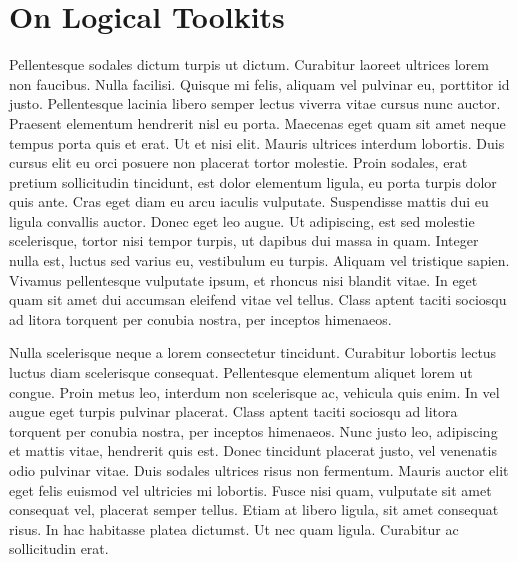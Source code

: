 \chapter{On Logical Toolkits}
Pellentesque sodales dictum turpis ut dictum. Curabitur laoreet ultrices lorem non faucibus. Nulla facilisi. Quisque mi felis, aliquam vel pulvinar eu, porttitor id justo. Pellentesque lacinia libero semper lectus viverra vitae cursus nunc auctor. Praesent elementum hendrerit nisl eu porta. Maecenas eget quam sit amet neque tempus porta quis et erat. Ut et nisi elit. Mauris ultrices interdum lobortis. Duis cursus elit eu orci posuere non placerat tortor molestie. Proin sodales, erat pretium sollicitudin tincidunt, est dolor elementum ligula, eu porta turpis dolor quis ante. Cras eget diam eu arcu iaculis vulputate. Suspendisse mattis dui eu ligula convallis auctor. Donec eget leo augue. Ut adipiscing, est sed molestie scelerisque, tortor nisi tempor turpis, ut dapibus dui massa in quam. Integer nulla est, luctus sed varius eu, vestibulum eu turpis. Aliquam vel tristique sapien. Vivamus pellentesque vulputate ipsum, et rhoncus nisi blandit vitae. In eget quam sit amet dui accumsan eleifend vitae vel tellus. Class aptent taciti sociosqu ad litora torquent per conubia nostra, per inceptos himenaeos.

Nulla scelerisque neque a lorem consectetur tincidunt. Curabitur lobortis lectus luctus diam scelerisque consequat. Pellentesque elementum aliquet lorem ut congue. Proin metus leo, interdum non scelerisque ac, vehicula quis enim. In vel augue eget turpis pulvinar placerat. Class aptent taciti sociosqu ad litora torquent per conubia nostra, per inceptos himenaeos. Nunc justo leo, adipiscing et mattis vitae, hendrerit quis est. Donec tincidunt placerat justo, vel venenatis odio pulvinar vitae. Duis sodales ultrices risus non fermentum. Mauris auctor elit eget felis euismod vel ultricies mi lobortis. Fusce nisi quam, vulputate sit amet consequat vel, placerat semper tellus. Etiam at libero ligula, sit amet consequat risus. In hac habitasse platea dictumst. Ut nec quam ligula. Curabitur ac sollicitudin erat.